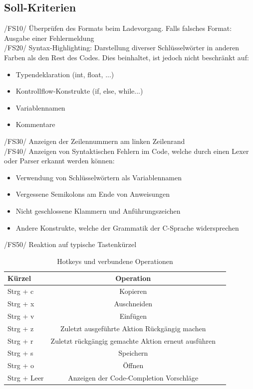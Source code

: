 \documentclass[a4paper]{scrreprt}
\begin{document}
\subsection{Soll-Kriterien}
/FS10/ Überprüfen des Formats beim Ladevorgang. Falls falsches Format: Ausgabe einer Fehlermeldung \\
/FS20/ Syntax-Highlighting: Darstellung diverser Schlüsselwörter in anderen Farben als den Rest des Codes. Dies beinhaltet, ist jedoch nicht beschränkt auf: 
\begin{itemize}
\item Typendeklaration (int, float, ...)
\item Kontrollflow-Konstrukte (if, else, while...)
\item Variablennamen
\item Kommentare
\end{itemize}
/FS30/ Anzeigen der Zeilennummern am linken Zeilenrand \\
/FS40/ Anzeigen von Syntaktischen Fehlern im Code, welche durch einen Lexer oder Parser erkannt werden können: 
\begin{itemize}
\item Verwendung von Schlüsselwörtern als Variablennamen 
\item Vergessene Semikolons am Ende von Anweisungen
\item Nicht geschlossene Klammern und Anführungszeichen
\item Andere Konstrukte, welche der Grammatik der C-Sprache widersprechen
\end{itemize}

/FS50/ Reaktion auf typische Tastenkürzel\\
\begin{table}[H]
\caption{Hotkeys und verbundene Operationen}
\begin{tabular}{lcr} 
Kürzel & Operation \\
\hline 
Strg + c & Kopieren \\
Strg + x & Auschneiden \\
Strg + v & Einfügen \\
Strg + z & Zuletzt ausgeführte Aktion Rückgängig machen \\
Strg + r & Zuletzt rückgängig gemachte Aktion erneut ausführen \\
Strg + s & Speichern \\
Strg + o & Öffnen \\
Strg + Leer & Anzeigen der Code-Completion Vorschläge\\
\end{tabular}
\label{table:Hotkeys_and_operations}
\end{table}
\end{document}
